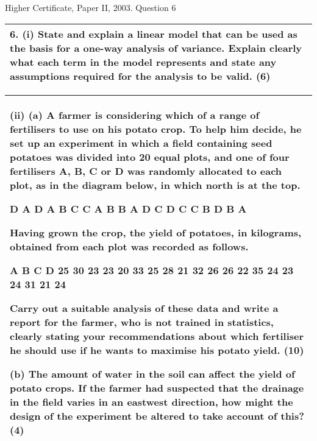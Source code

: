 \documentclass[a4paper,12pt]{article}
\begin{document}
Higher Certificate, Paper II, 2003. Question 6
\begin{table}[ht!]
 
\centering
 
\begin{tabular}{|p{15cm}|}
 
\hline  


6. (i) State and explain a linear model that can be used as the basis for a one-way analysis of variance.  Explain clearly what each term in the model represents and state any assumptions required for the analysis to be valid. (6) 
 

 


\\ \hline
  
\end{tabular}

\end{table}
\begin{table}[ht!]
 
\centering
 
\begin{tabular}{|p{15cm}|}
 
\hline 
 (ii) (a) A farmer is considering which of a range of fertilisers to use on his potato crop.  To help him decide, he set up an experiment in which a field containing seed potatoes was divided into 20 equal plots, and one of four fertilisers A, B, C or D was randomly allocated to each plot, as in the diagram below, in which north is at the top. 
 
D A D A B C C A B B A D C D C C B D B A 
 
Having grown the crop, the yield of potatoes, in kilograms, obtained from each plot was recorded as follows. 
 
A B C D 25 30 23 23 20 33 25 28 21 32 26 26 22 35 24 23 24 31 21 24 
 
 
Carry out a suitable analysis of these data and write a report for the farmer, who is not trained in statistics, clearly stating your recommendations about which fertiliser he should use if he wants to maximise his potato yield. (10) 
 
  (b) The amount of water in the soil can affect the yield of potato crops.  If the farmer had suspected that the drainage in the field varies in an eastwest direction, how might the design of the experiment be altered to take account of this? (4) 
 
 
\\ \hline
  
\end{tabular}

\end{table}
 
\end{document}
